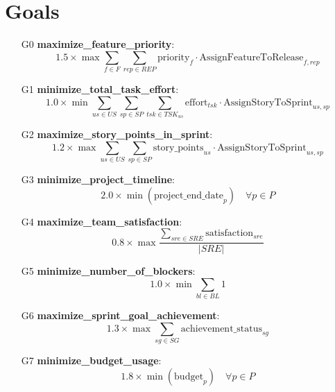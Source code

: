 \documentclass{article}
\begin{document}
\section{Goals}
\begin{itemize}
    \item[G0] \textbf{maximize\_feature\_priority}:
    \[ 1.5 \times \max \sum_{f \in F} \sum_{rep \in REP} \text{priority}_f \cdot \text{AssignFeatureToRelease}_{f, rep} \]
    \item[G1] \textbf{minimize\_total\_task\_effort}:
    \[ 1.0 \times \min \sum_{us \in US} \sum_{sp \in SP} \sum_{tsk \in TSK_{us}} \text{effort}_{tsk} \cdot \text{AssignStoryToSprint}_{us, sp} \]
    \item[G2] \textbf{maximize\_story\_points\_in\_sprint}:
    \[ 1.2 \times \max \sum_{us \in US} \sum_{sp \in SP} \text{story\_points}_{us} \cdot \text{AssignStoryToSprint}_{us, sp} \]
    \item[G3] \textbf{minimize\_project\_timeline}:
    \[ 2.0 \times \min (\text{project\_end\_date}_p) \quad \forall p \in P \]
    \item[G4] \textbf{maximize\_team\_satisfaction}:
    \[ 0.8 \times \max \frac{\sum_{sre \in SRE} \text{satisfaction}_{sre}}{|SRE|} \]
    \item[G5] \textbf{minimize\_number\_of\_blockers}:
    \[ 1.0 \times \min \sum_{bl \in BL} 1 \]
    \item[G6] \textbf{maximize\_sprint\_goal\_achievement}:
    \[ 1.3 \times \max \sum_{sg \in SG} \text{achievement\_status}_{sg} \]
    \item[G7] \textbf{minimize\_budget\_usage}:
    \[ 1.8 \times \min (\text{budget}_p) \quad \forall p \in P \]
\end{itemize}
\end{document}
